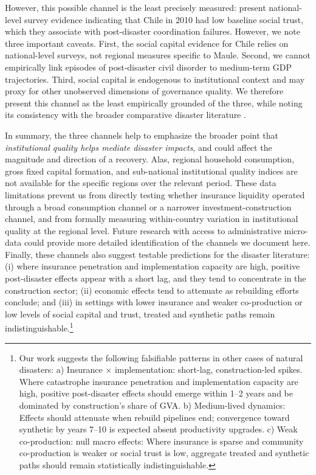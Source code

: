 \documentclass[12pt]{article}
\begin{document}
However, this possible channel is the least precisely measured: \textcite{dussaillant2014trust} present national-level survey evidence indicating that Chile in 2010 had low baseline social trust, which they associate with post-disaster coordination failures. However, we note three important caveats. First, the social capital evidence for Chile relies on national-level surveys, not regional measures specific to Maule. Second, we cannot empirically link episodes of post-disaster civil disorder to medium-term GDP trajectories. Third, social capital is endogenous to institutional context and may proxy for other unobserved dimensions of governance quality. We therefore present this channel as the least empirically grounded of the three, while noting its consistency with the broader comparative disaster literature \parencite{aldrich2015social,storr2016community}.

In summary, the three channels help to emphasize the broader point that \emph{institutional quality helps mediate disaster impacts}, and could affect the magnitude and direction of a recovery. Alas, regional household consumption, gross fixed capital formation, and sub-national institutional quality indices are not available for the specific regions over the relevant period. These data limitations prevent us from directly testing whether insurance liquidity operated through a broad consumption channel or a narrower investment-construction channel, and from formally measuring within-country variation in institutional quality at the regional level. Future research with access to administrative micro-data could provide more detailed identification of the channels we document here. Finally, these channels also suggest testable predictions for the disaster literature: (i) where insurance penetration and implementation capacity are high, positive post-disaster effects appear with a short lag, and they tend to concentrate in the construction sector; (ii) economic effects tend to attenuate as rebuilding efforts conclude; and (iii) in settings with lower insurance and weaker co-production or low levels of social capital and trust, treated and synthetic paths remain indistinguishable.\footnote{Our work suggests the following falsifiable patterns in other cases of natural disasters: a) Insurance $\times$ implementation: short-lag, construction-led spikes. Where catastrophe insurance penetration and implementation capacity are high, positive post-disaster effects should emerge within 1--2 years and be dominated by construction's share of GVA. b) Medium-lived dynamics: Effects should attenuate when rebuild pipelines end; convergence toward synthetic by years 7--10 is expected absent productivity upgrades. c) Weak co-production: null macro effects: Where insurance is sparse and community co-production is weaker or social trust is low, aggregate treated and synthetic paths should remain statistically indistinguishable.} 
\end{document}
